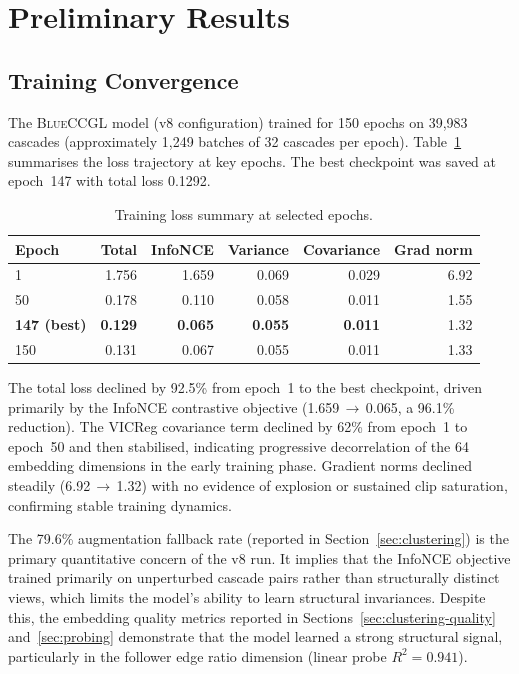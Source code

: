 \documentclass[12pt, a4paper]{article}
\newcommand{\BLUECCGL}{\textsc{BlueCCGL}\xspace}
\begin{document}
\section{Preliminary Results}
\label{sec:results}

\subsection{Training Convergence}

The \BLUECCGL model (v8 configuration) trained for 150 epochs on 39,983 cascades (approximately 1,249 batches of 32 cascades per epoch). Table~\ref{tab:training} summarises the loss trajectory at key epochs. The best checkpoint was saved at epoch~147 with total loss 0.1292.

\begin{table}[H]
\centering
\caption{Training loss summary at selected epochs.}
\label{tab:training}
\begin{tabular}{@{}lrrrrr@{}}
\toprule
\textbf{Epoch} & \textbf{Total} & \textbf{InfoNCE} & \textbf{Variance} & \textbf{Covariance} & \textbf{Grad norm} \\
\midrule
1              & 1.756  & 1.659  & 0.069 & 0.029 & 6.92 \\
50             & 0.178  & 0.110  & 0.058 & 0.011 & 1.55 \\
\textbf{147 (best)} & \textbf{0.129} & \textbf{0.065} & \textbf{0.055} & \textbf{0.011} & 1.32 \\
150            & 0.131  & 0.067  & 0.055 & 0.011 & 1.33 \\
\bottomrule
\end{tabular}
\end{table}

The total loss declined by 92.5\% from epoch~1 to the best checkpoint, driven primarily by the InfoNCE contrastive objective (1.659\,$\to$\,0.065, a 96.1\% reduction). The VICReg covariance term declined by 62\% from epoch~1 to epoch~50 and then stabilised, indicating progressive decorrelation of the 64 embedding dimensions in the early training phase. Gradient norms declined steadily (6.92\,$\to$\,1.32) with no evidence of explosion or sustained clip saturation, confirming stable training dynamics.

The 79.6\% augmentation fallback rate (reported in Section~\ref{sec:clustering}) is the primary quantitative concern of the v8 run. It implies that the InfoNCE objective trained primarily on unperturbed cascade pairs rather than structurally distinct views, which limits the model's ability to learn structural invariances. Despite this, the embedding quality metrics reported in Sections~\ref{sec:clustering-quality} and~\ref{sec:probing} demonstrate that the model learned a strong structural signal, particularly in the follower edge ratio dimension (linear probe $R^2 = 0.941$).
\end{document}
